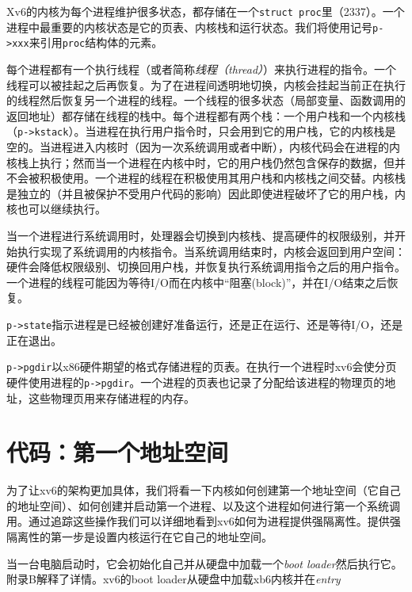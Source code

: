 Xv6的内核为每个进程维护很多状态，都存储在一个\texttt{struct proc}里（2337）。一个进程中最重要的内核状态是它的页表、内核栈和运行状态。我们将使用记号\texttt{p->xxx}来引用\texttt{proc}结构体的元素。

每个进程都有一个执行线程（或者简称\emph{线程（thread）}）来执行进程的指令。一个线程可以被挂起之后再恢复。为了在进程间透明地切换，内核会挂起当前正在执行的线程然后恢复另一个进程的线程。一个线程的很多状态（局部变量、函数调用的返回地址）都存储在线程的栈中。每个进程都有两个栈：一个用户栈和一个内核栈（\texttt{p->kstack}）。当进程在执行用户指令时，只会用到它的用户栈，它的内核栈是空的。当进程进入内核时（因为一次系统调用或者中断），内核代码会在进程的内核栈上执行；然而当一个进程在内核中时，它的用户栈仍然包含保存的数据，但并不会被积极使用。一个进程的线程在积极使用其用户栈和内核栈之间交替。内核栈是独立的（并且被保护不受用户代码的影响）因此即使进程破坏了它的用户栈，内核也可以继续执行。

当一个进程进行系统调用时，处理器会切换到内核栈、提高硬件的权限级别，并开始执行实现了系统调用的内核指令。当系统调用结束时，内核会返回到用户空间：硬件会降低权限级别、切换回用户栈，并恢复执行系统调用指令之后的用户指令。一个进程的线程可能因为等待I/O而在内核中“阻塞(block)”，并在I/O结束之后恢复。

\texttt{p->state}指示进程是已经被创建好准备运行，还是正在运行、还是等待I/O，还是正在退出。

\texttt{p->pgdir}以x86硬件期望的格式存储进程的页表。在执行一个进程时xv6会使分页硬件使用进程的\texttt{p->pgdir}。一个进程的页表也记录了分配给该进程的物理页的地址，这些物理页用来存储进程的内存。

\section{代码：第一个地址空间}
为了让xv6的架构更加具体，我们将看一下内核如何创建第一个地址空间（它自己的地址空间）、如何创建并启动第一个进程、以及这个进程如何进行第一个系统调用。通过追踪这些操作我们可以详细地看到xv6如何为进程提供强隔离性。提供强隔离性的第一步是设置内核运行在它自己的地址空间。

当一台电脑启动时，它会初始化自己并从硬盘中加载一个\emph{boot loader}然后执行它。附录B解释了详情。xv6的boot loader从硬盘中加载xb6内核并在\emph{entry}
